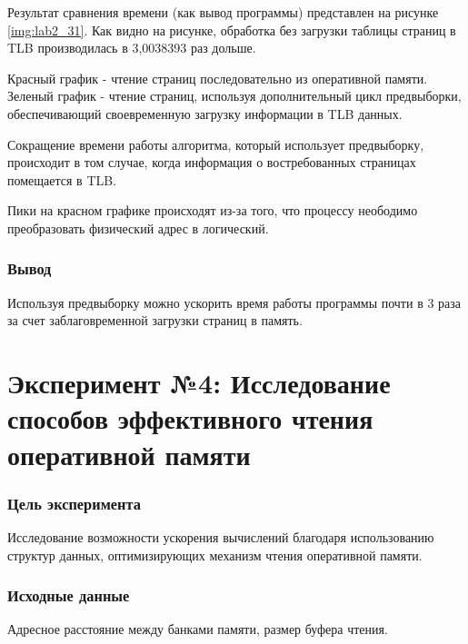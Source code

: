 
Результат сравнения времени (как вывод программы) представлен на рисунке \ref{img:lab2_31}. Как видно на рисунке, обработка без загрузки таблицы страниц в TLB производилась в 3,0038393 раз дольше.


Красный график - чтение страниц последовательно из оперативной памяти. Зеленый график - чтение страниц, используя дополнительный цикл предвыборки, обеспечивающий своевременную загрузку информации в TLB данных.

Сокращение времени работы алгоритма, который использует предвыборку, происходит в том случае, когда информация о востребованных страницах помещается в TLB. 

Пики на красном графике происходят из-за того, что процессу неободимо преобразовать физический адрес в логический.

\subsection*{Вывод}
Используя предвыборку можно ускорить время работы программы почти в 3 раза за счет заблаговременной загрузки страниц в память.



\chapter*{Эксперимент №4: Исследование способов эффективного чтения оперативной памяти}

\subsection*{Цель эксперимента}
Исследование возможности ускорения вычислений благодаря использованию структур данных, оптимизирующих механизм чтения оперативной памяти.

\subsection*{Исходные данные}
Адресное расстояние между банками памяти, размер буфера чтения.

